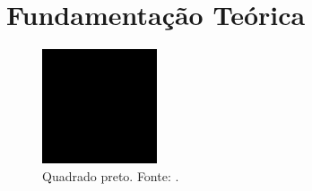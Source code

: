 \section{Fundamentação Teórica}%
\label{cap:fundamentacao}

\begin{figure}[!ht]%
    \centering
    \includegraphics[scale=0.5]{img/black-square.png}
    \caption{Quadrado preto. Fonte: \cite{tortinhas}.}%
    \label{fig:f1}
\end{figure}

